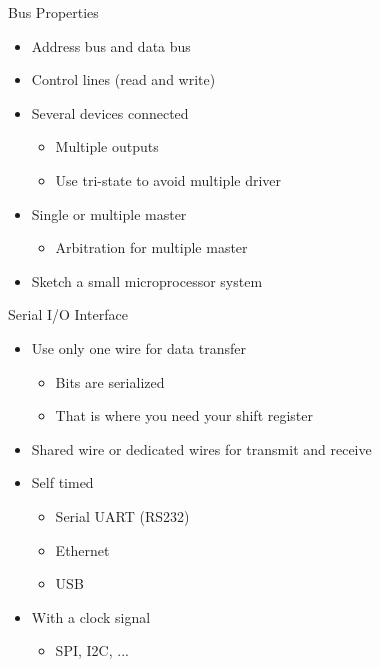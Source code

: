 \begin{frame}[fragile]{Bus Properties}
\begin{itemize}
\item Address bus and data bus
\item Control lines (read and write)
\item Several devices connected
\begin{itemize}
\item Multiple outputs
\item Use tri-state to avoid multiple driver
\end{itemize}
\item Single or multiple master
\begin{itemize}
\item Arbitration for multiple master
\end{itemize}
\item Sketch a small microprocessor system
\end{itemize}
\end{frame}

\begin{frame}[fragile]{Serial I/O Interface}
\begin{itemize}
\item Use only one wire for data transfer
\begin{itemize}
\item Bits are serialized
\item That is where you need your shift register
\end{itemize}
\item Shared wire or dedicated wires for transmit and receive
\item Self timed
\begin{itemize}
\item Serial UART (RS232)
\item Ethernet
\item USB
\end{itemize}
\item With a clock signal
\begin{itemize}
\item SPI, I2C, ...
\end{itemize}
\end{itemize}
\end{frame}




